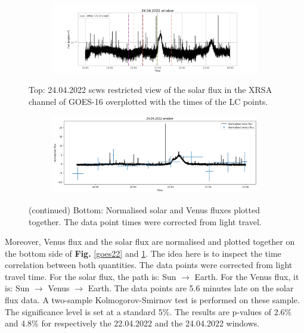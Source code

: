 \begin{figure}[H]
    \centering
    \begin{subfigure}{0.9\textwidth}
        \includegraphics[width=\textwidth]{report/Figures/results/GOES_24.png}
    \end{subfigure}%
    \caption{Top: 24.04.2022 scws restricted view of the solar flux in the XRSA channel of GOES-16 overplotted with the times of the LC points.}
    \label{goes_24}
\end{figure}

\begin{figure}[H]
    \ContinuedFloat
    \centering
    \begin{subfigure}{0.75\textwidth}
        \includegraphics[width=\textwidth]{report/Figures/results/norm_24.png}
    \end{subfigure}
    \caption*{(continued) Bottom: Normalised solar and Venus fluxes plotted together. The data point times were corrected from light travel.}
\end{figure}

Moreover, Venus flux and the solar flux are normalised and plotted together on the bottom side of \textbf{Fig.} \ref{goes22} and \ref{goes_24}. The idea here is to inspect the time correlation between both quantities.  The data points were corrected from light travel time. For the solar flux, the path is: Sun $\rightarrow$ Earth. For the Venus flux, it is: Sun $\rightarrow$ Venus $\rightarrow$ Earth. The data points are 5.6 minutes late on the solar flux data. A two-sample Kolmogorov-Smirnov test is performed on these sample. The significance level is set at a standard 5\%. The results are p-values of 2.6\% and 4.8\% for respectively the 22.04.2022 and the 24.04.2022 windows.

